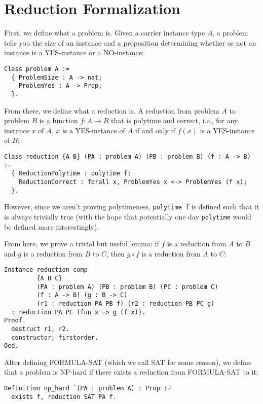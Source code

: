 \documentclass{article}
\begin{document}
\section{Reduction Formalization}

First, we define what a problem is. Given a carrier instance type $A$, a problem
tells you the size of an instance and a proposition determining whether or not
an instance is a YES-instance or a NO-instance:

\begin{verbatim}
Class problem A :=
  { ProblemSize : A -> nat;
    ProblemYes : A -> Prop;
  }.
\end{verbatim}

From there, we define what a reduction is. A reduction from problem $A$ to
problem $B$ is a function $f : A \to B$ that is polytime and correct, i.e., for
any instance $x$ of $A$, $x$ is a YES-instance of $A$ if and only if $f(x)$ is a
YES-instance of $B$:
\begin{verbatim}
Class reduction {A B} (PA : problem A) (PB : problem B) (f : A -> B) :=
  { ReductionPolytime : polytime f;
    ReductionCorrect : forall x, ProblemYes x <-> ProblemYes (f x);
  }.
\end{verbatim}
However, since we aren't proving polytimeness, \texttt{polytime f} is
defined such that it is always trivially true (with the hope that potentially
one day \texttt{polytime} would be defined more interestingly).

From here, we prove a trivial but useful lemma: if $f$ is a reduction from $A$
to $B$ and $g$ is a reduction from $B$ to $C$, then $g \circ f$ is a reduction
from $A$ to $C$:
\begin{samepage}
\begin{verbatim}
Instance reduction_comp
         {A B C}
         (PA : problem A) (PB : problem B) (PC : problem C)
         (f : A -> B) (g : B -> C)
         (r1 : reduction PA PB f) (r2 : reduction PB PC g)
  : reduction PA PC (fun x => g (f x)).
Proof.
  destruct r1, r2.
  constructor; firstorder.
Qed.
\end{verbatim}
\end{samepage}

After defining FORMULA-SAT (which we call SAT for some reason), we define that a
problem is NP-hard if there exists a reduction from FORMULA-SAT to it:
\begin{samepage}
  \begin{verbatim}
Definition np_hard `(PA : problem A) : Prop :=
  exists f, reduction SAT PA f.
  \end{verbatim}
\end{samepage}
\end{document}

